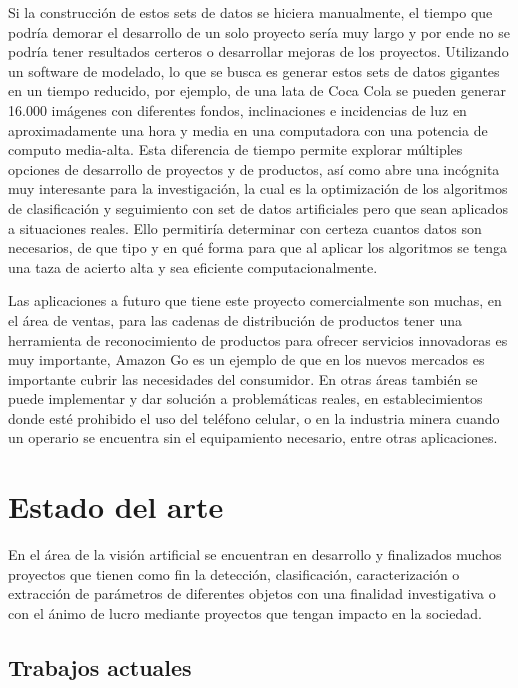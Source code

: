 \documentclass[conference]{IEEEtran}
\begin{document}
Si la construcción de estos sets de datos se hiciera manualmente, el tiempo que podría demorar el desarrollo de un solo proyecto sería muy largo y por ende no se podría tener resultados certeros o desarrollar mejoras de los proyectos. Utilizando un software de modelado, lo que se busca es generar estos sets de datos gigantes en un tiempo reducido, por ejemplo, de una lata de Coca Cola se pueden generar 16.000 imágenes con diferentes fondos, inclinaciones e incidencias de luz en aproximadamente una hora y media en una computadora con una potencia de computo media-alta.  Esta diferencia de tiempo permite explorar múltiples opciones de desarrollo de proyectos y de productos, así como abre una incógnita muy interesante para la investigación, la cual es la optimización de los algoritmos de clasificación y seguimiento con set de datos artificiales pero que sean aplicados a situaciones reales. Ello permitiría determinar con certeza cuantos datos son necesarios, de que tipo y en qué forma para que al aplicar los algoritmos se tenga una taza de acierto alta y sea eficiente computacionalmente.

Las aplicaciones a futuro que tiene este proyecto comercialmente son muchas, en el área de ventas, para las cadenas de distribución de productos tener una herramienta de reconocimiento de productos para ofrecer servicios innovadoras es muy importante, Amazon Go es un ejemplo de que en los nuevos mercados es importante cubrir las necesidades del consumidor. En otras áreas también se puede implementar y dar solución a problemáticas reales, en establecimientos donde esté prohibido el uso del teléfono celular, o en la industria minera cuando un operario se encuentra sin el equipamiento necesario, entre otras aplicaciones.

\section{Estado del arte}
En el área de la visión artificial se encuentran en desarrollo y finalizados muchos proyectos que tienen como fin la detección, clasificación, caracterización o extracción de parámetros de diferentes objetos con una finalidad investigativa o con el ánimo de lucro mediante proyectos que tengan impacto en la sociedad.
\subsection{Trabajos actuales}
\end{document}
